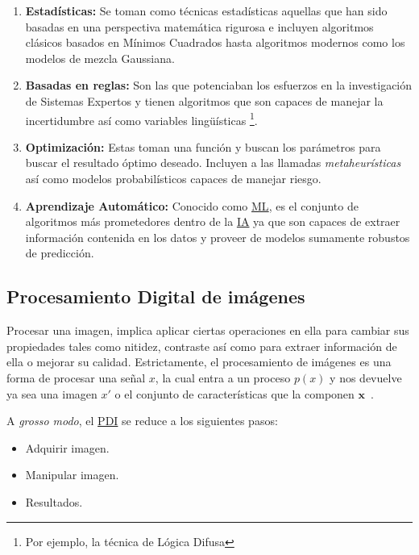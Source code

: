\begin{enumerate}
    \item{\textbf{Estadísticas: }} Se toman como técnicas estadísticas aquellas
    que han sido basadas en una perspectiva matemática rigurosa e incluyen
    algoritmos clásicos basados en Mínimos Cuadrados hasta algoritmos modernos
    como los modelos de mezcla Gaussiana.
    \item{\textbf{Basadas en reglas: }} Son las que potenciaban los esfuerzos en
    la investigación de Sistemas Expertos y tienen algoritmos que son capaces de
    manejar la incertidumbre así como variables lingüísticas \footnote{Por
    ejemplo, la técnica de Lógica Difusa}.
    \item{\textbf{Optimización: }} Estas toman una función y buscan los
    parámetros para buscar el resultado óptimo deseado. Incluyen a las llamadas
    \emph{metaheurísticas} así como modelos probabilísticos capaces de manejar
    riesgo.
    \item{\textbf{Aprendizaje Automático: }} Conocido como \hyperlink{abbr}{ML},
    es el conjunto de algoritmos más prometedores dentro de la
    \hyperlink{abbr}{IA} ya que son capaces de extraer información contenida en
    los datos y proveer de modelos sumamente robustos de predicción.
\end{enumerate}

\subsection{Procesamiento Digital de imágenes}

Procesar una imagen, implica aplicar ciertas operaciones en ella para cambiar
sus propiedades tales como nitidez, contraste así como para extraer información
de ella o mejorar su calidad. Estrictamente, el procesamiento de imágenes es una
forma de procesar una señal \(x\), la cual entra a un proceso \(p(x)\) y nos
devuelve ya sea una imagen \(x'\) o el conjunto de características que la
componen \(\mathbf{x}\)~\cite{UniversityofTartu}.

\begin{minipage}{\textwidth}
A \emph{grosso modo}, el \hyperlink{abbr}{PDI} se reduce a los siguientes pasos:
\begin{itemize}
    \item Adquirir imagen.
    \item Manipular imagen.
    \item Resultados.
\end{itemize}
\end{minipage}

